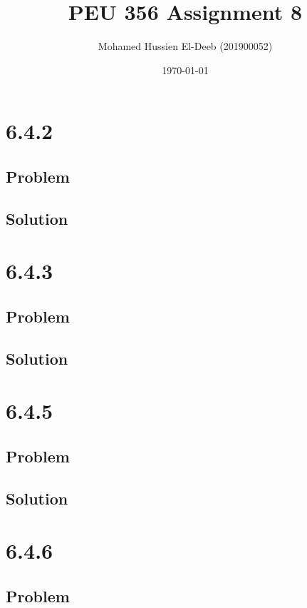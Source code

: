 \documentclass[12pt]{article}
\title{PEU 356 Assignment 8}
\author{Mohamed Hussien El-Deeb (201900052)}
\date{\today}
\begin{document}
\maketitle
\tableofcontents
\hypersetup{linkcolor=RoyalBlue4}

\newpage
\section{6.4.2}

\subsection{Problem}

\subsection{Solution}

\newpage
\section{6.4.3}

\subsection{Problem}

\subsection{Solution}

\newpage
\section{6.4.5}

\subsection{Problem}

\subsection{Solution}

\newpage
\section{6.4.6}

\subsection{Problem}
\end{document}
